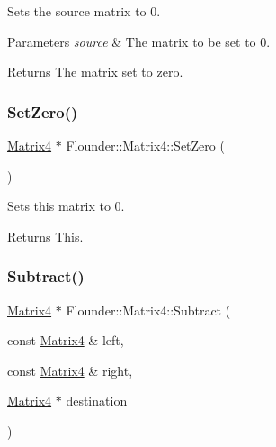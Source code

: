 Sets the source matrix to 0. 


\begin{DoxyParams}{Parameters}
{\em source} & The matrix to be set to 0. \\
\hline
\end{DoxyParams}
\begin{DoxyReturn}{Returns}
The matrix set to zero. 
\end{DoxyReturn}
\mbox{\label{class_flounder_1_1_matrix4_aad9bda4702a5c43914377e9156cbecdb}} 
\subsubsection{\texorpdfstring{Set\+Zero()}{SetZero()}\hspace{0.1cm}{\footnotesize\ttfamily [2/2]}}
{\footnotesize\ttfamily \hyperlink{class_flounder_1_1_matrix4}{Matrix4} $\ast$ Flounder\+::\+Matrix4\+::\+Set\+Zero (\begin{DoxyParamCaption}{ }\end{DoxyParamCaption})}



Sets this matrix to 0. 

\begin{DoxyReturn}{Returns}
This. 
\end{DoxyReturn}
\mbox{\label{class_flounder_1_1_matrix4_a2a6916d0c3baea67ac8f1cf88f4b2c4e}} 
\subsubsection{\texorpdfstring{Subtract()}{Subtract()}}
{\footnotesize\ttfamily \hyperlink{class_flounder_1_1_matrix4}{Matrix4} $\ast$ Flounder\+::\+Matrix4\+::\+Subtract (\begin{DoxyParamCaption}\item[{const \hyperlink{class_flounder_1_1_matrix4}{Matrix4} \&}]{left,  }\item[{const \hyperlink{class_flounder_1_1_matrix4}{Matrix4} \&}]{right,  }\item[{\hyperlink{class_flounder_1_1_matrix4}{Matrix4} $\ast$}]{destination }\end{DoxyParamCaption})\hspace{0.3cm}{\ttfamily [static]}}



